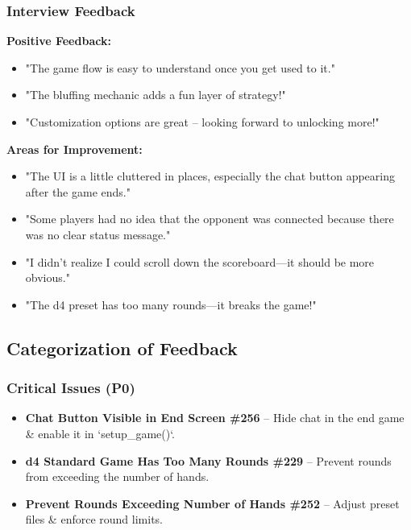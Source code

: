 \documentclass{article}
\begin{document}
\subsubsection{Interview Feedback}
\textbf{Positive Feedback:}
\begin{itemize}
    \item "The game flow is easy to understand once you get used to it."
    \item "The bluffing mechanic adds a fun layer of strategy!"
    \item "Customization options are great – looking forward to unlocking more!"
\end{itemize}

\textbf{Areas for Improvement:}
\begin{itemize}
    \item "The UI is a little cluttered in places, especially the chat button appearing after the game ends."
    \item "Some players had no idea that the opponent was connected because there was no clear status message."
    \item "I didn’t realize I could scroll down the scoreboard—it should be more obvious."
    \item "The d4 preset has too many rounds—it breaks the game!"
\end{itemize}

\subsection{Categorization of Feedback}

\subsubsection{Critical Issues (P0)}
\begin{itemize}
    \item \textbf{Chat Button Visible in End Screen \#256} – Hide chat in the end game \& enable it in `setup\_game()`.
    \item \textbf{d4 Standard Game Has Too Many Rounds \#229} – Prevent rounds from exceeding the number of hands.
    \item \textbf{Prevent Rounds Exceeding Number of Hands \#252} – Adjust preset files \& enforce round limits.
\end{itemize}
\end{document}
